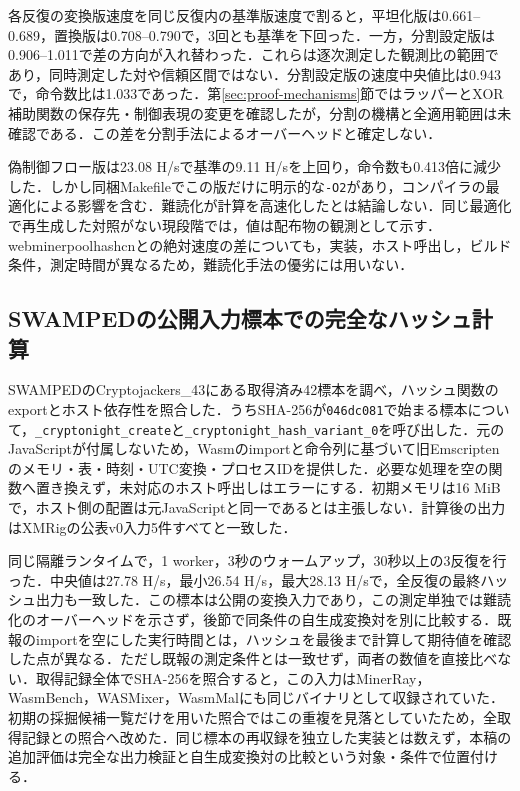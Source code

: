 \documentclass[submit,techrep]{ipsj}
\begin{document}
各反復の変換版速度を同じ反復内の基準版速度で割ると，平坦化版は0.661--0.689，置換版は0.708--0.790で，3回とも基準を下回った．一方，分割設定版は0.906--1.011で差の方向が入れ替わった．これらは逐次測定した観測比の範囲であり，同時測定した対や信頼区間ではない．分割設定版の速度中央値比は0.943で，命令数比は1.033であった．第\ref{sec:proof-mechanisms}節ではラッパーとXOR補助関数の保存先・制御表現の変更を確認したが，分割の機構と全適用範囲は未確認である．この差を分割手法によるオーバーヘッドと確定しない．

偽制御フロー版は23.08 H/sで基準の9.11 H/sを上回り，命令数も0.413倍に減少した．しかし同梱Makefileでこの版だけに明示的な\texttt{-O2}があり，コンパイラの最適化による影響を含む．難読化が計算を高速化したとは結論しない．同じ最適化で再生成した対照がない現段階では，値は配布物の観測として示す．webminerpoolhashcnとの絶対速度の差についても，実装，ホスト呼出し，ビルド条件，測定時間が異なるため，難読化手法の優劣には用いない．

\subsection{SWAMPEDの公開入力標本での完全なハッシュ計算}
\label{sec:swamped-hash}
SWAMPEDのCryptojackers\_43にある取得済み42標本を調べ，ハッシュ関数のexportとホスト依存性を照合した．うちSHA-256が\texttt{046dc081}で始まる標本について，\texttt{\_cryptonight\_create}と\texttt{\_cryptonight\_hash\_variant\_0}を呼び出した．元のJavaScriptが付属しないため，Wasmのimportと命令列に基づいて旧Emscriptenのメモリ・表・時刻・UTC変換・プロセスIDを提供した．必要な処理を空の関数へ置き換えず，未対応のホスト呼出しはエラーにする．初期メモリは16 MiBで，ホスト側の配置は元JavaScriptと同一であるとは主張しない．計算後の出力はXMRigの公表v0入力5件すべてと一致した．

同じ隔離ランタイムで，1 worker，3秒のウォームアップ，30秒以上の3反復を行った．中央値は27.78 H/s，最小26.54 H/s，最大28.13 H/sで，全反復の最終ハッシュ出力も一致した．この標本は公開の変換入力であり，この測定単独では難読化のオーバーヘッドを示さず，後節で同条件の自生成変換対を別に比較する．既報のimportを空にした実行時間とは，ハッシュを最後まで計算して期待値を確認した点が異なる．ただし既報の測定条件とは一致せず，両者の数値を直接比べない．取得記録全体でSHA-256を照合すると，この入力はMinerRay，WasmBench，WASMixer，WasmMalにも同じバイナリとして収録されていた．初期の採掘候補一覧だけを用いた照合ではこの重複を見落としていたため，全取得記録との照合へ改めた．同じ標本の再収録を独立した実装とは数えず，本稿の追加評価は完全な出力検証と自生成変換対の比較という対象・条件で位置付ける．
\end{document}

